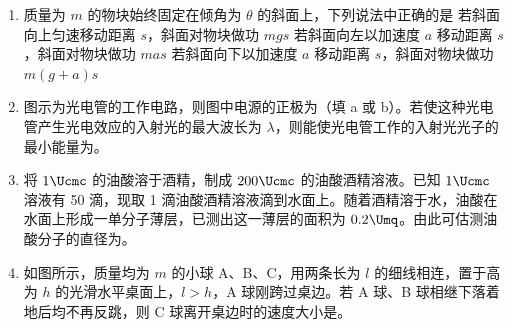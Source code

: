 \documentclass[\gkver]{gaokaozhenti}
\begin{document}
\begin{enumerate}

\item
质量为 $m$ 的物块始终固定在倾角为 $\theta$ 的斜面上，下列说法中正确的是
\onepicture[w=3.95cm]{}
{若斜面向上匀速移动距离 $s$，斜面对物块做功 $mgs$}
{若斜面向左以加速度 $a$ 移动距离 $s$，斜面对物块做功 $mas$}
{若斜面向下以加速度 $a$ 移动距离 $s$，斜面对物块做功 $m(g + a)s$}


\item
图示为光电管的工作电路，则图中电源的正极为（填 a 或 b）。若使这种光电管产生光电效应的入射光的最大波长为 $\lambda$，则能使光电管工作的入射光光子的最小能量为。
\onepicture[align=right, w=3.77cm]{}



\item
将 $1\Ucmc$ 的油酸溶于酒精，制成 $200\Ucmc$ 的油酸酒精溶液。已知 $1\Ucmc$ 溶液有 50 滴，现取 1 滴油酸酒精溶液滴到水面上。随着酒精溶于水，油酸在水面上形成一单分子薄层，已测出这一薄层的面积为 $0.2\Umq$。由此可估测油酸分子的直径为。



\item
如图所示，质量均为 $m$ 的小球 A、B、C，用两条长为 $l$ 的细线相连，置于高为 $h$ 的光滑水平桌面上，$l > h$，A 球刚跨过桌边。若 A 球、B 球相继下落着地后均不再反跳，则 C 球离开桌边时的速度大小是。
\onepicture[align=right, w=5.56cm]{}


\end{enumerate}
\end{document}
